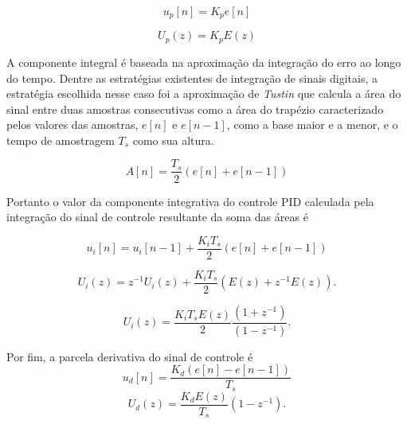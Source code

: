 \begin{equation}
    \label{eq:cd_6}
    u_p[n] = K_pe[n]
\end{equation}

\begin{equation}
    \label{eq:cd_6.1}
    U_p(z) = K_pE(z)
\end{equation}

A componente integral é baseada na aproximação da integração do erro ao longo do tempo. Dentre as estratégias existentes de integração de sinais digitais, a estratégia escolhida nesse caso foi a aproximação de \textit{Tustin} que calcula a área do sinal entre duas amostras consecutivas como a área do trapézio caracterizado pelos valores das amostras, $e[n]$ e $e[n-1]$, como a base maior e a menor, e o tempo de amostragem $T_s$ como sua altura.

\begin{equation}
    \label{eq:cd_7}
    A[n] = \frac{T_s}{2} (e[n]+e[n-1])
\end{equation}

Portanto o valor da componente integrativa do controle PID calculada pela integração do sinal de controle resultante da soma das áreas é

\begin{equation}
    \label{eq:cd_8}
    u_i[n] = u_i[n-1] + \frac{K_iT_s}{2} (e[n]+e[n-1])
\end{equation}


\begin{equation}
    \label{eq:cd_8.1}
    U_i(z) = z^{-1}U_i(z) + \frac{K_iT_s}{2} (E(z)+z^{-1}E(z)).
\end{equation}

\begin{equation}
    \label{eq:cd_8.2}
    U_i(z) =\frac{K_iT_sE(z)}{2} \frac{(1+z^{-1})}{(1-z^{-1})}.
\end{equation}

Por fim, a parcela derivativa do sinal de controle é
\begin{equation}
    \label{eq:cd_9}
    u_d[n] = \frac{K_d(e[n]-e[n-1])}{T_s}
\end{equation}
\begin{equation}
    \label{eq:cd_9.1}
    U_d(z) = \frac{K_dE(z)}{T_s} (1-z^{-1}).
\end{equation}

